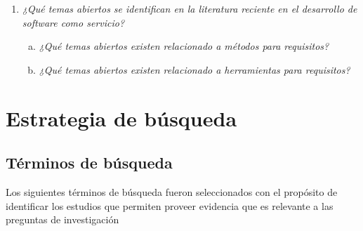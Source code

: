 \documentclass{article}
\begin{document}
\begin{enumerate}[P 1.-]
  \item\emph{¿Qué temas abiertos se identifican en la literatura reciente en el desarrollo de software como servicio?}
  \begin{enumerate}[(a)]
  \item \emph{¿Qué temas abiertos existen relacionado a métodos para requisitos?}
  \item \emph{¿Qué temas abiertos existen relacionado a herramientas para requisitos?}
  \end{enumerate}

\end{enumerate}

\newpage


\section{Estrategia de búsqueda}


\subsection{Términos de búsqueda}
Los siguientes términos de búsqueda fueron seleccionados con el propósito de identificar los estudios que 
permiten proveer evidencia que es relevante a las preguntas de investigación
\end{document}
